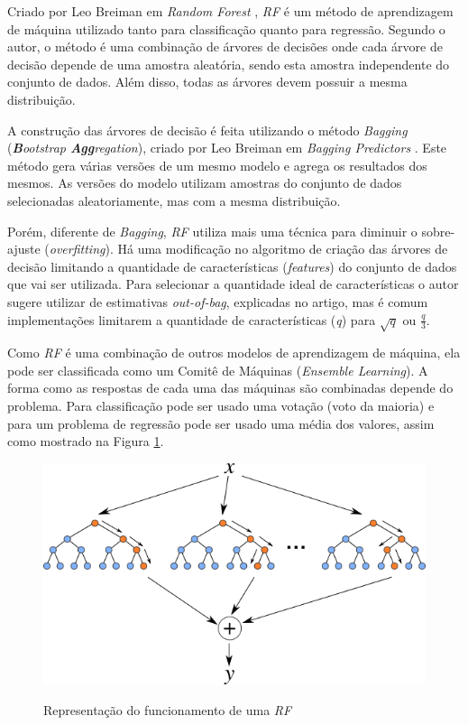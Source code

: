 Criado por Leo Breiman em \textit{Random Forest} \cite{Breiman:2001:RF:570181.570182}, \textit{\acrshort{RF}} é um método de aprendizagem de máquina utilizado tanto para classificação quanto para regressão. Segundo o autor, o método é uma combinação de árvores de decisões onde cada árvore de decisão depende de uma amostra aleatória, sendo esta amostra independente do conjunto de dados. Além disso, todas as árvores devem possuir a mesma distribuição. 

A construção das árvores de decisão é feita utilizando o método \textit{Bagging} (\textit{\textbf{B}ootstrap \textbf{Agg}regation}), criado por Leo Breiman em \textit{Bagging Predictors} \cite{Breiman:1996:BP:231986.231989}. Este método gera várias versões de um mesmo modelo e agrega os resultados dos mesmos. As versões do modelo utilizam amostras do conjunto de dados selecionadas aleatoriamente, mas com a mesma distribuição.

Porém, diferente de \textit{Bagging}, \textit{\acrshort{RF}} utiliza mais uma técnica para diminuir o sobre-ajuste (\textit{overfitting}). Há uma modificação no algoritmo de criação das árvores de decisão limitando a quantidade de características (\textit{features}) do conjunto de dados que vai ser utilizada. Para selecionar a quantidade ideal de características o autor sugere utilizar de estimativas \textit{out-of-bag}, explicadas no artigo, mas é comum implementações limitarem a quantidade de características (\textit{q}) para $ \sqrt{q} $ ou $ \frac{q}{3} $.

Como \textit{\acrshort{RF}} é uma combinação de outros modelos de aprendizagem de máquina, ela pode ser classificada como um Comitê de Máquinas (\textit{Ensemble Learning}). A forma como as respostas de cada uma das máquinas são combinadas depende do problema. Para classificação pode ser usado uma votação (voto da maioria) e para um problema de regressão pode ser usado uma média dos valores, assim como mostrado na Figura \ref{figure:random_forest}.

\begin{figure}[htbp]
    \centering
    \includegraphics[scale=0.8]{monography/img/random_forest.png}
    \label{figure:random_forest}
    \caption[Representação do funcionamento de uma \textit{\acrshort{RF}}]{Representação do funcionamento de uma \textit{\acrshort{RF}}\footnotemark}
\end{figure}

